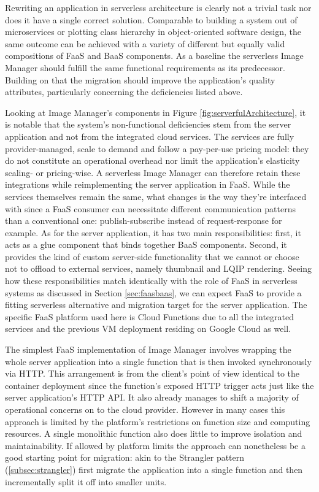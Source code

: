 Rewriting an application in serverless architecture is clearly not a trivial task nor does it have a single correct solution. Comparable to building a system out of microservices or plotting class hierarchy in object-oriented software design, the same outcome can be achieved with a variety of different but equally valid compositions of FaaS and BaaS components. As a baseline the serverless Image Manager should fulfill the same functional requirements as its predecessor. Building on that the migration should improve the application's quality attributes, particularly concerning the deficiencies listed above.

Looking at Image Manager's components in Figure \ref{fig:serverfulArchitecture}, it is notable that the system's non-functional deficiencies stem from the server application and not from the integrated cloud services. The services are fully provider-managed, scale to demand and follow a pay-per-use pricing model: they do not constitute an operational overhead nor limit the application's elasticity scaling- or pricing-wise. A serverless Image Manager can therefore retain these integrations while reimplementing the server application in FaaS. While the services themselves remain the same, what changes is the way they're interfaced with since a FaaS consumer can necessitate different communication patterns than a conventional one: publish-subscribe instead of request-response for example. As for the server application, it has two main responsibilities: first, it acts as a glue component that binds together BaaS components. Second, it provides the kind of custom server-side functionality that we cannot or choose not to offload to external services, namely thumbnail and LQIP rendering. Seeing how these responsibilities match identically with the role of FaaS in serverless systems as discussed in Section \ref{sec:faasbaas}, we can expect FaaS to provide a fitting serverless alternative and migration target for the server application. The specific FaaS platform used here is Cloud Functions \parencite{google18cloudFunctions} due to all the integrated services and the previous VM deployment residing on Google Cloud as well.

The simplest FaaS implementation of Image Manager involves wrapping the whole server application into a single function that is then invoked synchronously via HTTP. This arrangement is from the client's point of view identical to the container deployment since the function's exposed HTTP trigger acts just like the server application's HTTP API. It also already manages to shift a majority of operational concerns on to the cloud provider. However in many cases this approach is limited by the platform's restrictions on function size and computing resources. A single monolithic function also does little to improve isolation and maintainability. If allowed by platform limits the approach can nonetheless be a good starting point for migration: akin to the Strangler pattern (\ref{subsec:strangler}) first migrate the application into a single function and then incrementally split it off into smaller units.

